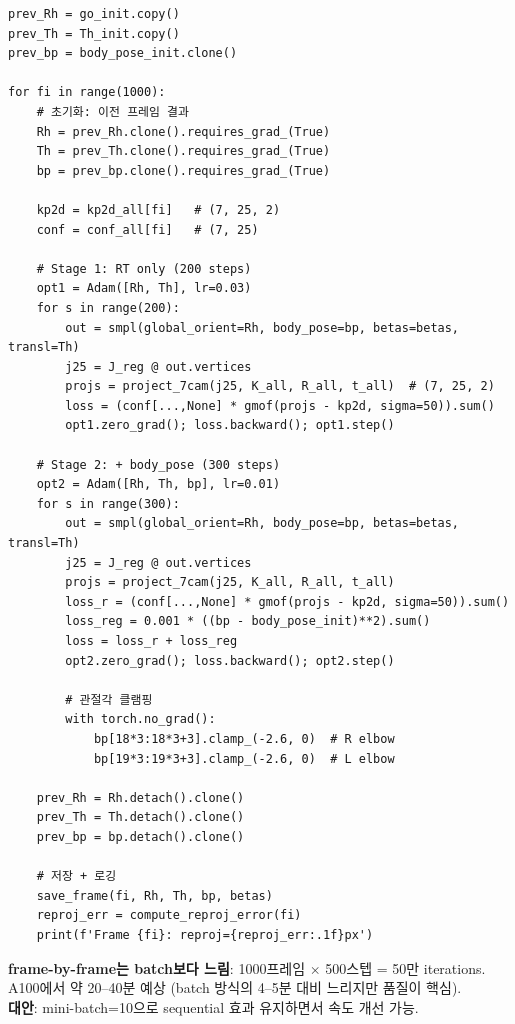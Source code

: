 \documentclass[11pt, a4paper]{report}
\begin{document}
\begin{codebox}[title={핵심 최적화 루프 (pseudo-code)}]
\begin{verbatim}
prev_Rh = go_init.copy()
prev_Th = Th_init.copy()
prev_bp = body_pose_init.clone()

for fi in range(1000):
    # 초기화: 이전 프레임 결과
    Rh = prev_Rh.clone().requires_grad_(True)
    Th = prev_Th.clone().requires_grad_(True)
    bp = prev_bp.clone().requires_grad_(True)

    kp2d = kp2d_all[fi]   # (7, 25, 2)
    conf = conf_all[fi]   # (7, 25)

    # Stage 1: RT only (200 steps)
    opt1 = Adam([Rh, Th], lr=0.03)
    for s in range(200):
        out = smpl(global_orient=Rh, body_pose=bp, betas=betas, transl=Th)
        j25 = J_reg @ out.vertices
        projs = project_7cam(j25, K_all, R_all, t_all)  # (7, 25, 2)
        loss = (conf[...,None] * gmof(projs - kp2d, sigma=50)).sum()
        opt1.zero_grad(); loss.backward(); opt1.step()

    # Stage 2: + body_pose (300 steps)
    opt2 = Adam([Rh, Th, bp], lr=0.01)
    for s in range(300):
        out = smpl(global_orient=Rh, body_pose=bp, betas=betas, transl=Th)
        j25 = J_reg @ out.vertices
        projs = project_7cam(j25, K_all, R_all, t_all)
        loss_r = (conf[...,None] * gmof(projs - kp2d, sigma=50)).sum()
        loss_reg = 0.001 * ((bp - body_pose_init)**2).sum()
        loss = loss_r + loss_reg
        opt2.zero_grad(); loss.backward(); opt2.step()

        # 관절각 클램핑
        with torch.no_grad():
            bp[18*3:18*3+3].clamp_(-2.6, 0)  # R elbow
            bp[19*3:19*3+3].clamp_(-2.6, 0)  # L elbow

    prev_Rh = Rh.detach().clone()
    prev_Th = Th.detach().clone()
    prev_bp = bp.detach().clone()

    # 저장 + 로깅
    save_frame(fi, Rh, Th, bp, betas)
    reproj_err = compute_reproj_error(fi)
    print(f'Frame {fi}: reproj={reproj_err:.1f}px')
\end{verbatim}
\end{codebox}

\begin{warningbox}
\textbf{frame-by-frame는 batch보다 느림}: 1000프레임 $\times$ 500스텝 = 50만 iterations.\\
A100에서 약 20--40분 예상 (batch 방식의 4--5분 대비 느리지만 품질이 핵심).\\
\textbf{대안}: mini-batch=10으로 sequential 효과 유지하면서 속도 개선 가능.
\end{warningbox}
\end{document}
